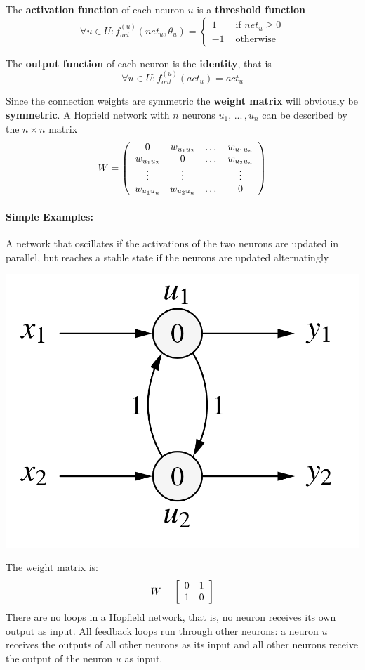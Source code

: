 The \textbf{activation function} of each neuron $u$ is a \textbf{threshold function}
$$ \forall u \in U: f^{(u)}_{act} (net_u, \theta_u) =
\begin{cases}
	1 & \text{ if } net_u \geq 0 \\
	-1 & \text{ otherwise}
\end{cases}
$$

The \textbf{output function} of each neuron is the \textbf{identity}, that is
$$ \forall u \in U: f_{out}^{(u)} (act_u) = act_u $$

Since the connection weights are symmetric the \textbf{weight matrix} will obviously be \textbf{symmetric}. A Hopfield network with $n$ neurons $u_1, \, ... \, , u_n$ can be described by the $n \times n$ matrix
$$ 
W = \left(
\begin{array}{c c c c}
	0 & w_{u_1u_2} & \dots & w_{u_1u_n}\\
	w_{u_1u_2} & 0 & \dots & w_{u_2u_n} \\
	\vdots & \vdots & & \vdots \\
	w_{u_1u_n} & w_{u_2u_n} & \dots & 0 
\end{array}
\right)
$$

\newpage

\paragraph{Simple Examples:} A network that oscillates if the activations of the two neurons are updated in parallel, but reaches a stable state if the neurons are updated alternatingly
\begin{center}
	\includegraphics[width=0.45\columnwidth]{img/NN/HN1}
\end{center}
The weight matrix is: 
$$ W = \left[
\begin{array}{c c}
	0 & 1 \\
	1 & 0
\end{array}
\right]
$$
There are no loops in a Hopfield network, that is, no neuron receives its own output as input. All feedback loops run through other neurons: a neuron $u$ receives the outputs of all other neurons as its input and all other neurons receive the output of the neuron $u$ as input. \\

